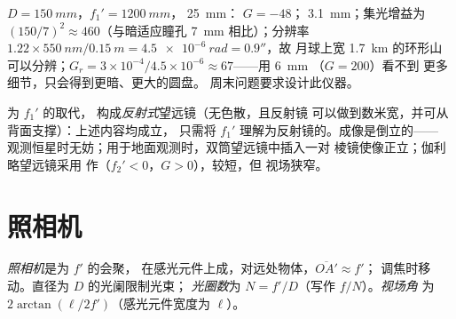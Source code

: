 \begin{example}\label{ex:b1:optical-instruments:telnum}
$D = \qty{150}{mm}$，$f_1' = \qty{1200}{mm}$， \qty{25}{mm}：
$G = -48$； \qty{3.1}{mm}；集光增益为 $(150/7)^2 \approx
460$（与暗适应瞳孔 \qty{7}{mm} 相比）；分辨率 $1.22 \times
\qty{550}{nm}/\qty{0.15}{m} = \qty{4.5e-6}{rad} = 0.9''$，故
月球上宽 \qty{1.7}{km} 的环形山可以分辨；$G_r = 3\times10^{-4}/4.5\times
10^{-6} \approx 67$——用 \qty{6}{mm} （$G = 200$）看不到
更多细节，只会得到更暗、更大的圆盘。
周末问题要求设计此仪器。
\end{example}

\begin{remark}\label{rem:b1:optical-instruments:variants}
为 $f_1'$ 的取代，
构成\emph{反射式}望远镜（无色散，且反射镜
可以做到数米宽，并可从背面支撑）：上述内容均成立，
只需将 $f_1'$ 理解为反射镜的。成像是倒立的——
观测恒星时无妨；用于地面观测时，双筒望远镜中插入一对
棱镜使像正立；伽利略望远镜采用
作（$f_2' < 0$，$G > 0$），较短，但
视场狭窄。
\end{remark}

\section{照相机}

\begin{definition}\label{def:b1:optical-instruments:camera}
\emph{照相机}是为 $f'$ 的会聚，
在感光元件上成，对远处物体，$\overline{OA'} \approx f'$；
调焦时移动。直径为 $D$ 的光阑限制光束；
\emph{光圈数}为 $N = f'/D$（写作 $f/N$）。\emph{视场角}
为 $2\arctan(\ell/2f')$（感光元件宽度为 $\ell$）。
\end{definition}

